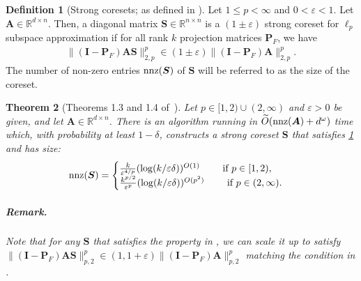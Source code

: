 \documentclass[11pt]{article}
\theoremstyle{plain}
\newtheorem{theorem}{Theorem}[section]
\theoremstyle{plain}
\theoremstyle{definition}
\newtheorem{defn}[theorem]{Definition}
\theoremstyle{plain}
\theoremstyle{remark}
\newcommand{\RR}{\mathbb{R}}
\newcommand{\eps}{\varepsilon}
\begin{document}
\begin{defn}[Strong coresets; as defined in \cite{WY24}]
\label{defn:strong_coreset}
    Let $1\leq p<\infty$ and $0<\varepsilon <1 $. Let $\bm{A}\in \RR^{d\times n}$. Then, a diagonal matrix $\bm{S}\in \RR^{n\times n}$ is a $(1\pm\varepsilon)$ strong coreset for $\ell_p$ subspace approximation if for all rank $k$ projection matrices $\bm{P}_F$, we have
    \begin{align}
\label{eqn:strong_coreset_property}        \|(\bm{I}-\bm{P}_F)\bm{A}\bm{S}\|_{2,p}^p \in  (1\pm \varepsilon)\|(\bm{I}-\bm{P}_F)\bm{A}\|_{2,p}^p.
    \end{align}
The number of non-zero entries  $\textnormal{nnz}(\bm{S})$ of $\bm{S}$ will be referred to as the size of the coreset. 
\end{defn}
\begin{theorem}[Theorems 1.3 and 1.4 of~\cite{WY25}] \label{thm:coresets-lp}
Let $p \in [1, 2) \cup (2, \infty)$ and $\eps >0$ be given, and let $\bm{A}\in \RR^{d\times n}$. There is an algorithm running in $\widetilde{O}(\textnormal{nnz}(\bm{A})+d^\omega)$ time which, with probability at least $1-\delta$, constructs a strong coreset $\bm{S}$ that satisfies \cref{defn:strong_coreset} and has size:
\begin{equation}\label{eq:coreset-size-lp}
\textnormal{nnz}(\bm{S}) = \begin{cases}
\frac{k}{\varepsilon^{4/p}}(\log(k/\varepsilon \delta))^{O(1)} \qquad \text{ if $p \in [1, 2)$}, \\
\frac{k^{p/2}}{\varepsilon^{p}}(\log(k/\varepsilon \delta))^{O(p^2)} \qquad \text{ if $p \in (2, \infty)$}.
\end{cases}
\end{equation}
\subparagraph*{Remark.} Note that for any $\bm{S}$ that satisfies the property in , we can scale it up to satisfy  $\|(\bm{I}-\bm{P}_F)\bm{A}\bm{S}\|_{p,2}^p \in  (1, 1+\varepsilon)\|(\bm{I}-\bm{P}_F)\bm{A}\|_{p,2}^p$ matching the condition in .
\end{theorem}
\end{document}
